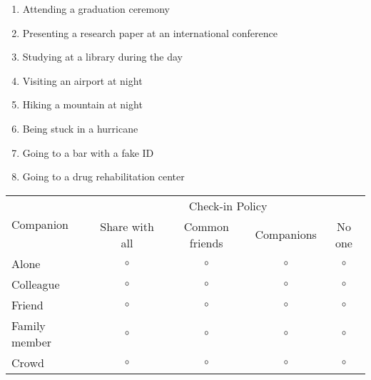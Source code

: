 \begin{enumerate}
    \item Attending a graduation ceremony

    \item Presenting a research paper at an international conference
    
    \item Studying at a library during the day
    
    \item Visiting an airport at night

    \item Hiking a mountain at night
    
    \item Being stuck in a hurricane 
    
    \item Going to a bar with a fake ID
    
    \item Going to a drug rehabilitation center
    
\end{enumerate}

\begin{table}[!h]
        \centering
        \begin{tabular}{lcccc}
            \toprule
             \multirow{2}{*}{Companion} & \multicolumn{4}{c}{Check-in Policy} \\\cmidrule{2-5}
             & Share with all & Common friends & Companions & No one \\
             \midrule
             Alone & $\circ$ & $\circ$ & $\circ$ & $\circ$ \\
             Colleague & $\circ$ & $\circ$ & $\circ$ & $\circ$ \\
             Friend & $\circ$ & $\circ$ & $\circ$ & $\circ$ \\
             Family member & $\circ$ & $\circ$ & $\circ$ & $\circ$ \\
             Crowd & $\circ$ & $\circ$ & $\circ$ & $\circ$ \\
             \bottomrule
        \end{tabular}
    \end{table}


